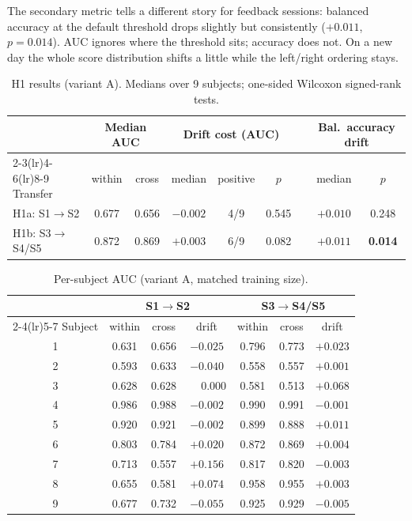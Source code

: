 \documentclass[11pt,a4paper]{article}
\newcommand{\arr}{$\rightarrow$}
\begin{document}
The secondary metric tells a different story for feedback sessions: balanced accuracy at the default threshold drops slightly
but consistently ($+0.011$, $p=0.014$). AUC ignores where the threshold sits; accuracy does not. On a new day the whole score
distribution shifts a little while the left/right ordering stays.

\begin{table}[H]
\centering\small
\caption{H1 results (variant A). Medians over 9 subjects; one-sided Wilcoxon signed-rank tests.}
\label{tab:h1}
\begin{tabular}{@{}lcccccccc@{}}
\toprule
 & \multicolumn{2}{c}{Median AUC} & \multicolumn{3}{c}{Drift cost (AUC)} & & \multicolumn{2}{c}{Bal.\ accuracy drift} \\
\cmidrule(lr){2-3}\cmidrule(lr){4-6}\cmidrule(lr){8-9}
Transfer & within & cross & median & positive & $p$ & & median & $p$ \\
\midrule
H1a: S1\arr S2      & 0.677 & 0.656 & $-0.002$ & 4/9 & 0.545 & & $+0.010$ & 0.248 \\
H1b: S3\arr S4/S5   & 0.872 & 0.869 & $+0.003$ & 6/9 & 0.082 & & $+0.011$ & \textbf{0.014} \\
\bottomrule
\end{tabular}
\end{table}

\begin{table}[H]
\centering\small
\caption{Per-subject AUC (variant A, matched training size).}
\label{tab:subj}
\begin{tabular}{@{}ccccccc@{}}
\toprule
 & \multicolumn{3}{c}{S1\arr S2} & \multicolumn{3}{c}{S3\arr S4/S5} \\
\cmidrule(lr){2-4}\cmidrule(lr){5-7}
Subject & within & cross & drift & within & cross & drift \\
\midrule
1 & 0.631 & 0.656 & $-0.025$ & 0.796 & 0.773 & $+0.023$ \\
2 & 0.593 & 0.633 & $-0.040$ & 0.558 & 0.557 & $+0.001$ \\
3 & 0.628 & 0.628 & $\phantom{+}0.000$ & 0.581 & 0.513 & $+0.068$ \\
4 & 0.986 & 0.988 & $-0.002$ & 0.990 & 0.991 & $-0.001$ \\
5 & 0.920 & 0.921 & $-0.002$ & 0.899 & 0.888 & $+0.011$ \\
6 & 0.803 & 0.784 & $+0.020$ & 0.872 & 0.869 & $+0.004$ \\
7 & 0.713 & 0.557 & $+0.156$ & 0.817 & 0.820 & $-0.003$ \\
8 & 0.655 & 0.581 & $+0.074$ & 0.958 & 0.955 & $+0.003$ \\
9 & 0.677 & 0.732 & $-0.055$ & 0.925 & 0.929 & $-0.005$ \\
\bottomrule
\end{tabular}
\end{table}
\end{document}
